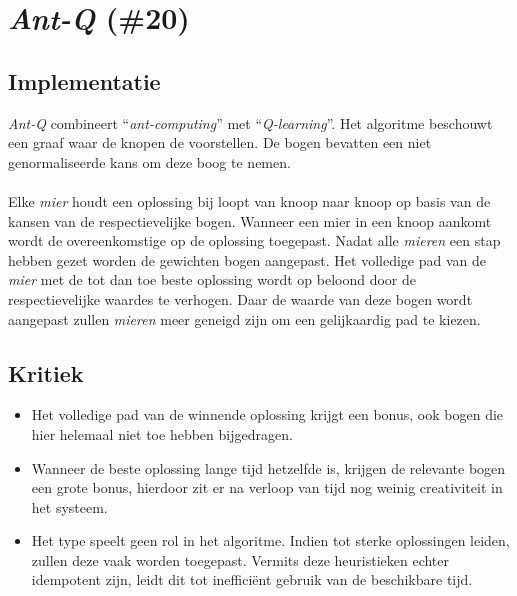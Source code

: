 \section{\emph{Ant-Q} (\#20)}
\subsection{Implementatie}
\emph{Ant-Q}\cite{chesc-ant-q,sis/ant-q} combineert ``\emph{ant-computing}''\cite{Michael:2009:AC:1596832.1596835} met ``\emph{Q-learning}''\cite{citeulike:5925674}. Het algoritme beschouwt een graaf waar de knopen de \abhn{} voorstellen. De bogen bevatten een niet genormaliseerde kans om deze boog te nemen.
\paragraph{}
Elke \emph{mier} houdt een oplossing bij loopt van knoop naar knoop op basis van de kansen van de respectievelijke bogen. Wanneer een mier in een knoop aankomt wordt de overeenkomstige \abh{} op de oplossing toegepast. Nadat alle \emph{mieren} een stap hebben gezet worden de gewichten bogen aangepast. Het volledige pad van de \emph{mier} met de tot dan toe beste oplossing wordt op beloond door de respectievelijke waardes te verhogen. Daar de waarde van deze bogen wordt aangepast zullen \emph{mieren} meer geneigd zijn om een gelijkaardig pad te kiezen.
\subsection{Kritiek}
\begin{itemize}
 \item Het volledige pad van de winnende oplossing krijgt een bonus, ook bogen die hier helemaal niet toe hebben bijgedragen.
 \item Wanneer de beste oplossing lange tijd hetzelfde is, krijgen de relevante bogen een grote bonus, hierdoor zit er na verloop van tijd nog weinig creativiteit in het systeem.
 \item Het type \abh{} speelt geen rol in het algoritme. Indien \abls{} \abhn{} tot sterke oplossingen leiden, zullen deze vaak worden toegepast. Vermits deze heuristieken echter idempotent zijn, leidt dit tot ineffici\"ent gebruik van de beschikbare tijd.
\end{itemize}